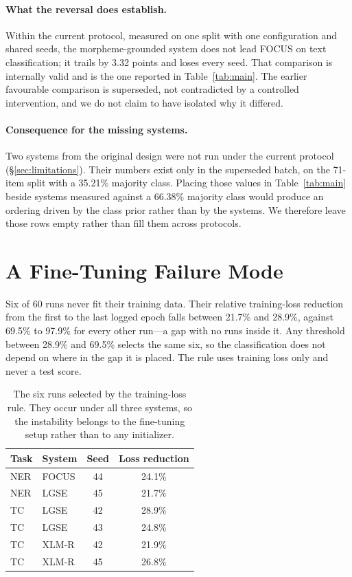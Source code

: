 \documentclass[11pt]{article}
\begin{document}
\paragraph{What the reversal does establish.} Within the current protocol,
measured on one split with one configuration and shared seeds, the
morpheme-grounded system does not lead FOCUS on text classification; it
trails by 3.32 points and loses every seed. That comparison is internally
valid and is the one reported in Table~\ref{tab:main}. The earlier
favourable comparison is superseded, not contradicted by a controlled
intervention, and we do not claim to have isolated why it differed.

\paragraph{Consequence for the missing systems.} Two systems from the
original design were not run under the current protocol
(\S\ref{sec:limitations}). Their numbers exist only in the superseded batch,
on the 71-item split with a 35.21\% majority class. Placing those values in
Table~\ref{tab:main} beside systems measured against a 66.38\% majority
class would produce an ordering driven by the class prior rather than by the
systems. We therefore leave those rows empty rather than fill them across
protocols.

\section{A Fine-Tuning Failure Mode}
\label{sec:failures}

Six of 60 runs never fit their training data. Their relative
training-loss reduction from the first to the last logged epoch falls between
21.7\% and 28.9\%, against 69.5\% to 97.9\% for every other run---a gap with
no runs inside it. Any threshold between 28.9\% and 69.5\% selects the same
six, so the classification does not depend on where in the gap it is placed.
The rule uses training loss only and never a test score.

\begin{table}[t]
\centering
\small
\begin{tabular}{llcc}
\toprule
Task & System & Seed & Loss reduction \\
\midrule
NER & FOCUS & 44 & 24.1\% \\
NER & LGSE  & 45 & 21.7\% \\
TC  & LGSE  & 42 & 28.9\% \\
TC  & LGSE  & 43 & 24.8\% \\
TC  & XLM-R & 42 & 21.9\% \\
TC  & XLM-R & 45 & 26.8\% \\
\bottomrule
\end{tabular}
\caption{The six runs selected by the training-loss rule. They occur under
all three systems, so the instability belongs to the fine-tuning setup
rather than to any initializer.}
\label{tab:fail}
\end{table}
\end{document}
